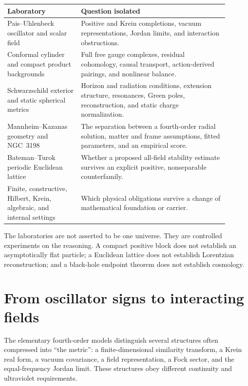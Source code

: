 \documentclass[11pt]{article}
\begin{document}
\begin{center}
\begin{tabular}{>{\raggedright\arraybackslash}p{0.30\linewidth}
                >{\raggedright\arraybackslash}p{0.60\linewidth}}
\toprule
Laboratory & Question isolated\\
\midrule
Pais--Uhlenbeck oscillator and scalar field
& Positive and Krein completions, vacuum representations, Jordan limits,
and interaction obstructions.\\
Conformal cylinder and compact product backgrounds
& Full free gauge complexes, residual cohomology, causal transport,
action-derived pairings, and nonlinear balance.\\
Schwarzschild exterior and static spherical metrics
& Horizon and radiation conditions, extension structure, resonances,
Green poles, reconstruction, and static charge normalization.\\
Mannheim--Kazanas geometry and NGC~3198
& The separation between a fourth-order radial solution, matter and frame
assumptions, fitted parameters, and an empirical score.\\
Bateman--Turok periodic Euclidean lattice
& Whether a proposed all-field stability estimate survives an explicit
positive, nonseparable counterfamily.\\
Finite, constructive, Hilbert, Krein, algebraic, and internal settings
& Which physical obligations survive a change of mathematical foundation or
carrier.\\
\bottomrule
\end{tabular}
\end{center}

The laboratories are not asserted to be one universe.  They are controlled
experiments on the reasoning.  A compact positive block does not establish an
asymptotically flat particle; a Euclidean lattice does not establish
Lorentzian reconstruction; and a black-hole endpoint theorem does not
establish cosmology.

\section{From oscillator signs to interacting fields}

The elementary fourth-order models distinguish several structures often
compressed into ``the metric'': a finite-dimensional similarity transform, a
Krein real form, a vacuum covariance, a field representation, a Fock sector,
and the equal-frequency Jordan limit.  These structures obey different
continuity and ultraviolet requirements.
\end{document}
